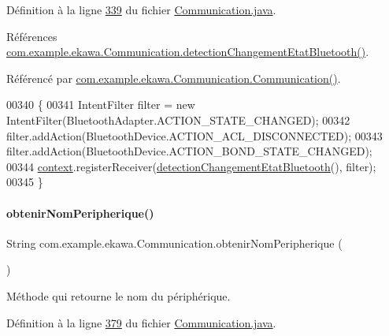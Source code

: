 Définition à la ligne \hyperlink{_communication_8java_source_l00339}{339} du fichier \hyperlink{_communication_8java_source}{Communication.\+java}.



Références \hyperlink{_communication_8java_source_l00078}{com.\+example.\+ekawa.\+Communication.\+detection\+Changement\+Etat\+Bluetooth()}.



Référencé par \hyperlink{_communication_8java_source_l00195}{com.\+example.\+ekawa.\+Communication.\+Communication()}.


\begin{DoxyCode}
00340     \{
00341         IntentFilter filter = \textcolor{keyword}{new} IntentFilter(BluetoothAdapter.ACTION\_STATE\_CHANGED);
00342         filter.addAction(BluetoothDevice.ACTION\_ACL\_DISCONNECTED);
00343         filter.addAction(BluetoothDevice.ACTION\_BOND\_STATE\_CHANGED);
00344         \hyperlink{classcom_1_1example_1_1ekawa_1_1_communication_aa5ae3c4eaab6ec31d3b358431e812d00}{context}.registerReceiver(\hyperlink{classcom_1_1example_1_1ekawa_1_1_communication_a7fb7acee2a343c884103481715ab4e65}{detectionChangementEtatBluetooth}(),
       filter);
00345     \}
\end{DoxyCode}
\mbox{\label{classcom_1_1example_1_1ekawa_1_1_communication_a133dd63afcf2d2f1229a416abe099494}} 
\paragraph{\texorpdfstring{obtenir\+Nom\+Peripherique()}{obtenirNomPeripherique()}}
{\footnotesize\ttfamily String com.\+example.\+ekawa.\+Communication.\+obtenir\+Nom\+Peripherique (\begin{DoxyParamCaption}{ }\end{DoxyParamCaption})}



Méthode qui retourne le nom du périphérique. 



Définition à la ligne \hyperlink{_communication_8java_source_l00379}{379} du fichier \hyperlink{_communication_8java_source}{Communication.\+java}.



